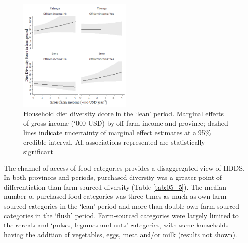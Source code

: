 \begin{figure}[H]
  \includegraphics[width=0.5\textwidth]{figs_05/image3.png}
  \captionsetup{singlelinecheck = off, justification=justified}
    \caption{Household diet diversity dcore in the `lean' period. Marginal effects of gross income (`000 USD) by off-farm income and province; dashed lines indicate uncertainty of marginal effect estimates at a 95\% credible interval. All associations represented are statistically significant}
    \label{fig:05_2}
\end{figure}

The channel of access of food categories provides a disaggregated view of HDDS. In both provinces and periods, purchased diversity was a greater point of differentiation than farm-sourced diversity (Table \ref{tab:05_5}). The median number of purchased food categories was three times as much as own farm-sourced categories in the `lean' period and more than double own farm-sourced categories in the `flush' period. Farm-sourced categories were largely limited to the cereals and `pulses, legumes and nuts' categories, with some households having the addition of vegetables, eggs, meat and/or milk (results not shown).


